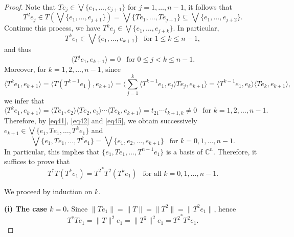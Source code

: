 \documentclass[11pt]{article}
\numberwithin{equation}{section}
\begin{document}
\begin{proof}
Note that $Te_j\in\bigvee\{e_1, \dots, e_{j+1}\}$ for $j=1, \dots, n-1$, it follows that
$$T^2e_j\in T(\bigvee\{e_1, \dots, e_{j+1}\})= \bigvee\{Te_1, \dots, Te_{j+1}\}\subseteq \bigvee\{e_1, \dots, e_{j+2}\}.$$
Continue this process, we have $T^ke_j\in \bigvee\{e_1, \dots, e_{j+k}\}$. In particular,
\begin{equation}\label{eq41}
T^ke_1\in \bigvee\{e_1, \dots, e_{k+1}\} \ \  \mbox{ for } 1\le k\le n-1,
\end{equation}
and thus
\begin{equation}\label{eq42}
\langle T^je_1, e_{k+1}\rangle=0 \ \  \mbox{ for } 0\le j<k\le n-1.
\end{equation}
Moreover, for $k=1,2,\ldots, n-1$, since
$$\langle T^ke_1, e_{k+1}\rangle= \langle T(T^{k-1}e_1), e_{k+1}\rangle = \langle \sum_{j=1}^k\langle T^{k-1}e_1, e_j\rangle Te_j, e_{k+1}\rangle= \langle T^{k-1}e_1, e_k\rangle  \langle Te_k, e_{k+1}\rangle,$$
we infer that
\begin{equation}\label{eq45}
\langle T^k e_1,e_{k+1}\rangle=\langle Te_1,e_{2}\rangle \langle T e_2,e_{3}\rangle \cdots \langle T e_k,e_{k+1}\rangle=t_{21}\cdots t_{k+1, k}\neq 0 \ \ \mbox{ for } k=1,2,\ldots, n-1.
\end{equation}
Therefore, by \eqref{eq41}, \eqref{eq42} and \eqref{eq45}, we obtain successively $e_{k+1}\in \bigvee\{e_1,Te_1,\ldots,T^k e_1\}$ and
$$
\bigvee\{e_1,Te_1,\ldots,T^k e_1\}
=
\bigvee\{e_1,e_2,\ldots,e_{k+1}\}\ \ \mbox{ for } k=0,1,\ldots,n-1.
$$
In particular, this implies that $\{e_1,Te_1, \ldots, T^{n-1}e_1\}$ is a basis of $\mathbb{C}^n$. Therefore, it suffices to prove that
\begin{equation}\label{eq43}
T^*T(T^k e_1) = {T^2}^*T^{2}(T^k e_1)\ \ \mbox{ for all }  k=0,1,\ldots,n-1.
\end{equation}

We proceed by induction on $k$.

\medskip
\noindent
\textbf{(i) The case $k=0$.}
Since $\|Te_1\|=\|T\|=\|T^2\|=\|T^2 e_1\|$, hence
\[
T^*T e_1 = \|T\|^2 e_1 = \|T^2\|^2 e_1 = {T^2}^*T^2 e_1.
\]


\end{proof}
\end{document}
